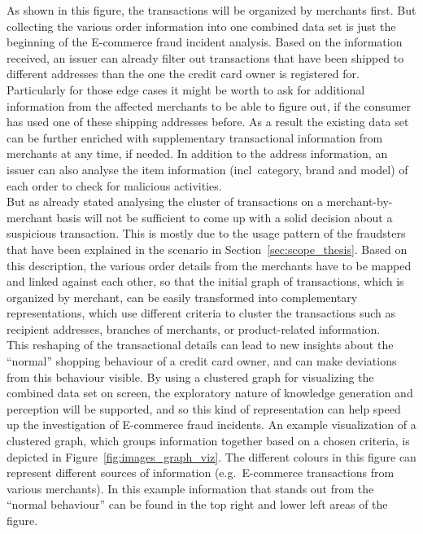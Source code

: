 As shown in this figure, the transactions will be organized by merchants first. But collecting the various order information into one combined data set is just the beginning of the \gls{E-commerce} fraud incident analysis. Based on the information received, an issuer can already filter out transactions that have been shipped to different addresses than the one the credit card owner is registered for. Particularly for those edge cases it might be worth to ask for additional information from the affected merchants to be able to figure out, if the consumer has used one of these shipping addresses before. As a result the existing data set can be further enriched with supplementary transactional information from merchants at any time, if needed. In addition to the address information, an issuer can also analyse the item information (\gls{incl}\ category, brand and model) of each order to check for malicious activities. \\

But as already stated analysing the cluster of transactions on a merchant-by-merchant basis will not be sufficient to come up with a solid decision about a suspicious transaction. This is mostly due to the usage pattern of the fraudsters that have been explained in the scenario in Section~\ref{sec:scope_thesis}. Based on this description, the various order details from the merchants have to be mapped and linked against each other, so that the initial graph of transactions, which is organized by merchant, can be easily transformed into complementary representations, which use different criteria to cluster the transactions such as recipient addresses, branches of merchants, or product-related information. \\

This reshaping of the transactional details can lead to new insights about the ``normal'' shopping behaviour of a credit card owner, and can make deviations from this behaviour visible. By using a clustered graph for visualizing the combined data set on screen, the exploratory nature of knowledge generation and perception will be supported, and so this kind of representation can help speed up the investigation of \gls{E-commerce} fraud incidents. An example visualization of a clustered graph, which groups information together based on a chosen criteria, is depicted in Figure~\ref{fig:images_graph_viz}. The different colours in this figure can represent different sources of information (e.g.\ \gls{E-commerce} transactions from various merchants). In this example information that stands out from the ``normal behaviour'' can be found in the top right and lower left areas of the figure. \@

